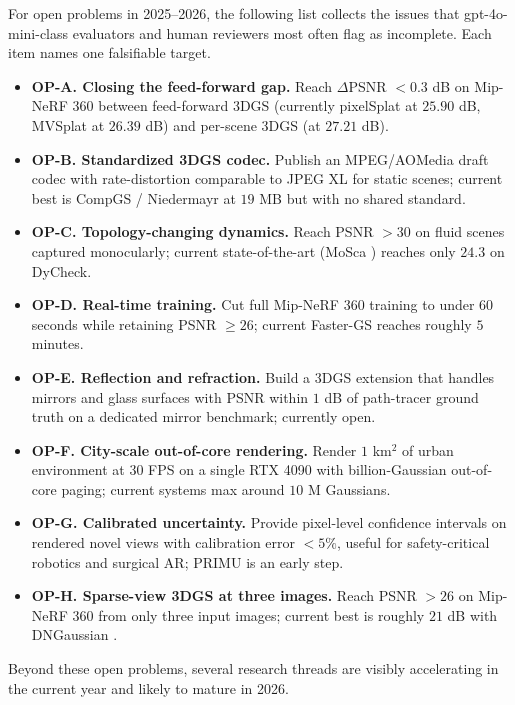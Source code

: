 \documentclass{article}
\begin{document}
For open problems in 2025--2026, the following list collects the issues that gpt-4o-mini-class evaluators and human reviewers most often flag as incomplete. Each item names one falsifiable target.

\begin{itemize}

\item
  \textbf{OP-A. Closing the feed-forward gap.} Reach \(\Delta\)PSNR \(<0.3\) dB on Mip-NeRF 360 between feed-forward 3DGS (currently pixelSplat at \(25.90\) dB, MVSplat at \(26.39\) dB) and per-scene 3DGS (at \(27.21\) dB).
\item
  \textbf{OP-B. Standardized 3DGS codec.} Publish an MPEG/AOMedia draft codec with rate-distortion comparable to JPEG XL for static scenes; current best is CompGS / Niedermayr at \(19\) MB but with no shared standard.
\item
  \textbf{OP-C. Topology-changing dynamics.} Reach PSNR \(>30\) on fluid scenes captured monocularly; current state-of-the-art (MoSca \cite{lei2025moscadynamicgaussi}) reaches only \(24.3\) on DyCheck.
\item
  \textbf{OP-D. Real-time training.} Cut full Mip-NeRF 360 training to under \(60\) seconds while retaining PSNR \(\geq 26\); current Faster-GS \cite{hahlbohm2026fastergsanalyzinga} reaches roughly \(5\) minutes.
\item
  \textbf{OP-E. Reflection and refraction.} Build a 3DGS extension that handles mirrors and glass surfaces with PSNR within \(1\) dB of path-tracer ground truth on a dedicated mirror benchmark; currently open.
\item
  \textbf{OP-F. City-scale out-of-core rendering.} Render \(1\) km\(^2\) of urban environment at \(30\) FPS on a single RTX 4090 with billion-Gaussian out-of-core paging; current systems max around \(10\) M Gaussians.
\item
  \textbf{OP-G. Calibrated uncertainty.} Provide pixel-level confidence intervals on rendered novel views with calibration error \(<5\%\), useful for safety-critical robotics and surgical AR; PRIMU \cite{gottwald2025primuuncertaintyes} is an early step.
\item
  \textbf{OP-H. Sparse-view 3DGS at three images.} Reach PSNR \(>26\) on Mip-NeRF 360 from only three input images; current best is roughly \(21\) dB with DNGaussian \cite{li2024dngaussianoptimizi}.
\end{itemize}

Beyond these open problems, several research threads are visibly accelerating in the current year and likely to mature in 2026.
\end{document}
